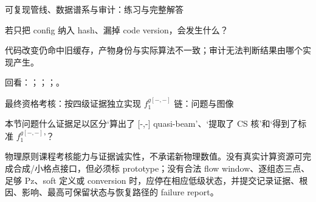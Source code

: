 \begin{frame}[t]{可复现管线、数据谱系与审计：练习与完整解答}
\footnotesize
\begin{block}{}若只把 config 纳入 hash、漏掉 code version，会发生什么？\end{block}
\begin{exampleblock}{}代码改变仍命中旧缓存，产物身份与实际算法不一致；审计无法判断结果由哪个实现产生。\end{exampleblock}
\vfill
\scriptsize 回看：；；；。
\end{frame}

\begin{frame}[t]{最终资格考核：按四级证据独立实现 \ensuremath{f_1^{g[-,-]}} 链：问题与图像}
\footnotesize
\begin{block}{本节问题}什么证据足以区分‘算出了 [-,-] quasi-beam’、‘提取了 CS 核’和‘得到了标准 \ensuremath{f_1^{g[-,-]}}’？\end{block}
\begin{block}{物理原则}\quad 课程考核能力与证据诚实性，不承诺新物理数值。没有真实计算资源可完成合成/\allowbreak{}小格点接口，但必须标 prototype；没有合法 flow window、逐组态三点、足够 Pz、soft 定义或 conversion 时，应停在相应低级状态，并提交记录证据、根因、影响、最高可保留状态与恢复路径的 failure report。\end{block}
\end{frame}


